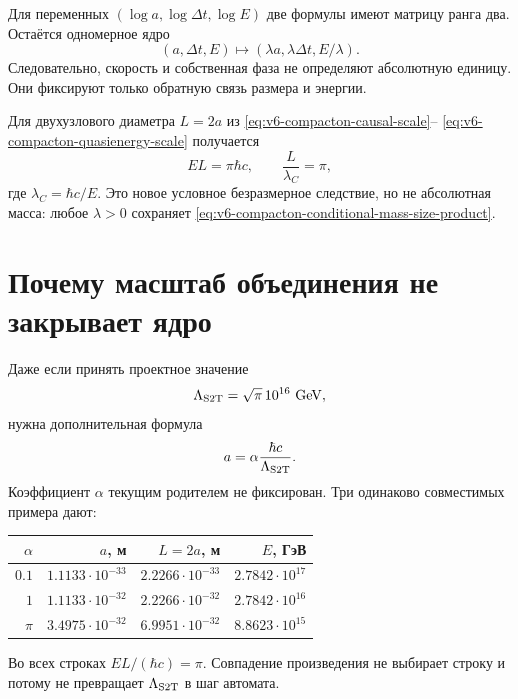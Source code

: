 Для переменных $(\log a,\log\Delta t,\log E)$ две формулы имеют матрицу
ранга два. Остаётся одномерное ядро
\begin{equation}
 (a,\Delta t,E)\longmapsto
 (\lambda a,\lambda\Delta t,E/\lambda).
 \label{eq:v6-compacton-scale-null-direction}
\end{equation}
Следовательно, скорость и собственная фаза не определяют абсолютную
единицу. Они фиксируют только обратную связь размера и энергии.

Для двухузлового диаметра $L=2a$ из
\eqref{eq:v6-compacton-causal-scale}--
\eqref{eq:v6-compacton-quasienergy-scale} получается
\begin{equation}
 \boxed{EL=\pi\hbar c},
 \qquad
 \frac{L}{\lambda_C}=\pi,
 \label{eq:v6-compacton-conditional-mass-size-product}
\end{equation}
где $\lambda_C=\hbar c/E$. Это новое условное безразмерное следствие, но
не абсолютная масса: любое $\lambda>0$ сохраняет
\eqref{eq:v6-compacton-conditional-mass-size-product}.

\section{Почему масштаб объединения не закрывает ядро}

Даже если принять проектное значение
\begin{equation}
 \Lambda_{\rm S2T}=\sqrt\pi\,10^{16}\ {\rm GeV},
\end{equation}
нужна дополнительная формула
\begin{equation}
 a=\alpha\frac{\hbar c}{\Lambda_{\rm S2T}}.
 \label{eq:v6-compacton-alpha-assignment}
\end{equation}
Коэффициент $\alpha$ текущим родителем не фиксирован. Три одинаково
совместимых примера дают:
\begin{center}
\begin{tabular}{@{}rrrr@{}}
\toprule
$\alpha$ & $a$, м & $L=2a$, м & $E$, ГэВ \\
\midrule
$0.1$ & $1.1133\cdot10^{-33}$ & $2.2266\cdot10^{-33}$ & $2.7842\cdot10^{17}$ \\
$1$ & $1.1133\cdot10^{-32}$ & $2.2266\cdot10^{-32}$ & $2.7842\cdot10^{16}$ \\
$\pi$ & $3.4975\cdot10^{-32}$ & $6.9951\cdot10^{-32}$ & $8.8623\cdot10^{15}$ \\
\bottomrule
\end{tabular}
\end{center}
Во всех строках $EL/(\hbar c)=\pi$. Совпадение произведения не выбирает
строку и потому не превращает $\Lambda_{\rm S2T}$ в шаг автомата.

